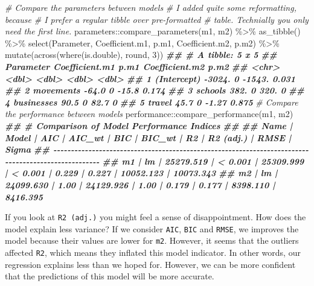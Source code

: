 \documentclass[
]{book}
\newenvironment{Shaded}{\begin{snugshade}}{\end{snugshade}}
\newcommand{\CommentTok}[1]{\textcolor[rgb]{0.56,0.35,0.01}{\textit{#1}}}
\newcommand{\DecValTok}[1]{\textcolor[rgb]{0.00,0.00,0.81}{#1}}
\newcommand{\DocumentationTok}[1]{\textcolor[rgb]{0.56,0.35,0.01}{\textbf{\textit{#1}}}}
\newcommand{\FunctionTok}[1]{\textcolor[rgb]{0.00,0.00,0.00}{#1}}
\newcommand{\NormalTok}[1]{#1}
\newcommand{\SpecialCharTok}[1]{\textcolor[rgb]{0.00,0.00,0.00}{#1}}
\begin{document}
\begin{Shaded}
\begin{Highlighting}[]
\CommentTok{\# Compare the parameters between models}
\CommentTok{\# I added quite some reformatting, because}
\CommentTok{\# I prefer a regular tibble over pre{-}formatted}
\CommentTok{\# table. Technially you only need the first line.}
\NormalTok{parameters}\SpecialCharTok{::}\FunctionTok{compare\_parameters}\NormalTok{(m1, m2) }\SpecialCharTok{\%\textgreater{}\%}
  \FunctionTok{as\_tibble}\NormalTok{() }\SpecialCharTok{\%\textgreater{}\%}
  \FunctionTok{select}\NormalTok{(Parameter, Coefficient.m1, p.m1, Coefficient.m2, p.m2) }\SpecialCharTok{\%\textgreater{}\%}
  \FunctionTok{mutate}\NormalTok{(}\FunctionTok{across}\NormalTok{(}\FunctionTok{where}\NormalTok{(is.double), round, }\DecValTok{3}\NormalTok{))}
\DocumentationTok{\#\# \# A tibble: 5 x 5}
\DocumentationTok{\#\#   Parameter   Coefficient.m1  p.m1 Coefficient.m2  p.m2}
\DocumentationTok{\#\#   \textless{}chr\textgreater{}                \textless{}dbl\textgreater{} \textless{}dbl\textgreater{}          \textless{}dbl\textgreater{} \textless{}dbl\textgreater{}}
\DocumentationTok{\#\# 1 (Intercept)        {-}3024.      0       {-}1543.   0.031}
\DocumentationTok{\#\# 2 movements            {-}64.0     0         {-}15.8  0.174}
\DocumentationTok{\#\# 3 schools              382.      0         320.   0    }
\DocumentationTok{\#\# 4 businesses            90.5     0          82.7  0    }
\DocumentationTok{\#\# 5 travel                45.7     0          {-}1.27 0.875}
\CommentTok{\# Compare the performance between models}
\NormalTok{performance}\SpecialCharTok{::}\FunctionTok{compare\_performance}\NormalTok{(m1, m2)}
\DocumentationTok{\#\# \# Comparison of Model Performance Indices}
\DocumentationTok{\#\# }
\DocumentationTok{\#\# Name | Model |       AIC |  AIC\_wt |       BIC |  BIC\_wt |    R2 | R2 (adj.) |      RMSE |     Sigma}
\DocumentationTok{\#\# {-}{-}{-}{-}{-}{-}{-}{-}{-}{-}{-}{-}{-}{-}{-}{-}{-}{-}{-}{-}{-}{-}{-}{-}{-}{-}{-}{-}{-}{-}{-}{-}{-}{-}{-}{-}{-}{-}{-}{-}{-}{-}{-}{-}{-}{-}{-}{-}{-}{-}{-}{-}{-}{-}{-}{-}{-}{-}{-}{-}{-}{-}{-}{-}{-}{-}{-}{-}{-}{-}{-}{-}{-}{-}{-}{-}{-}{-}{-}{-}{-}{-}{-}{-}{-}{-}{-}{-}{-}{-}{-}{-}{-}{-}{-}{-}{-}{-}{-}{-}}
\DocumentationTok{\#\# m1   |    lm | 25279.519 | \textless{} 0.001 | 25309.999 | \textless{} 0.001 | 0.229 |     0.227 | 10052.123 | 10073.343}
\DocumentationTok{\#\# m2   |    lm | 24099.630 |    1.00 | 24129.926 |    1.00 | 0.179 |     0.177 |  8398.110 |  8416.395}
\end{Highlighting}
\end{Shaded}

If you look at \texttt{R2\ (adj.)} you might feel a sense of disappointment. How does the model explain less variance? If we consider \texttt{AIC}, \texttt{BIC} and \texttt{RMSE}, we improves the model because their values are lower for \texttt{m2}. However, it seems that the outliers affected \texttt{R2}, which means they inflated this model indicator. In other words, our regression explains less than we hoped for. However, we can be more confident that the predictions of this model will be more accurate.
\end{document}
